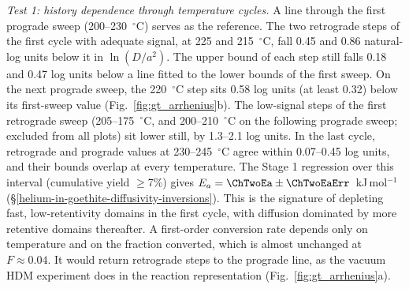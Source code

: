 \textit{Test 1: history dependence through temperature cycles.} A line through the first
prograde sweep (200--230~$^\circ$C) serves as the reference. The two retrograde steps of the
first cycle with adequate signal, at 225 and 215~$^\circ$C, fall 0.45 and 0.86 natural-log units
below it in $\ln(D/a^2)$. The upper bound of each step
still falls 0.18 and 0.47 log units below a line fitted to the lower bounds of the first sweep.
On the next prograde sweep, the 220~$^\circ$C step sits 0.58 log units (at least 0.32) below its
first-sweep value (Fig.~\ref{fig:gt_arrhenius}b). The low-signal steps of the first
retrograde sweep (205--175~$^\circ$C, and 200--210~$^\circ$C on the following prograde sweep;
excluded from all plots) sit lower still, by 1.3--2.1 log units. In the last cycle, retrograde and
prograde values at 230--245~$^\circ$C agree within 0.07--0.45 log units, and their bounds
overlap at every temperature. The Stage 1 regression over this interval (cumulative yield
$\geq$7\%) gives $E_a = \ChTwoEa\pm\ChTwoEaErr$~kJ\,mol$^{-1}$
(\S\ref{helium-in-goethite-diffusivity-inversions}). This is the signature of depleting fast,
low-retentivity domains in the first cycle, with diffusion dominated by more retentive domains
thereafter. A first-order conversion rate depends only on temperature and on the fraction
converted, which is almost unchanged at $F\approx0.04$. It would return retrograde steps to the
prograde line, as the vacuum HDM experiment does in the reaction representation
(Fig.~\ref{fig:gt_arrhenius}a).

